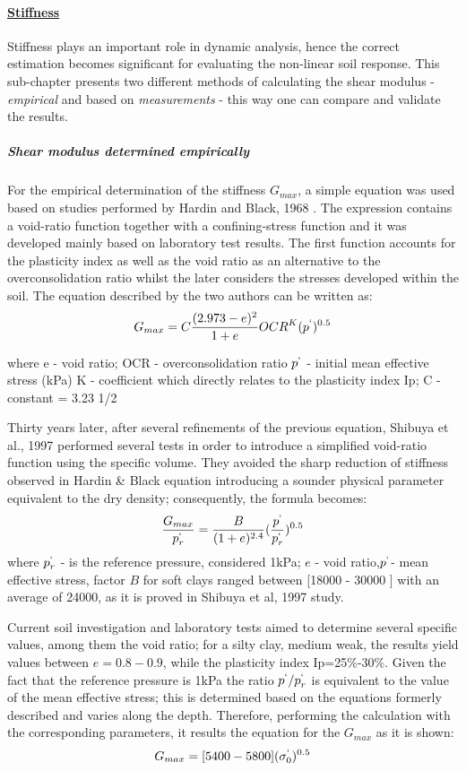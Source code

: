 \documentclass[12pt,a4paper]{report}
\begin{document}
\paragraph{\underline{Stiffness}}
Stiffness plays an important role in dynamic analysis, hence the correct estimation becomes significant for evaluating the non-linear soil response. This sub-chapter presents two different methods of calculating the shear modulus - \textit{empirical} and based on \textit{measurements} - this way one can compare and validate the results.

\subparagraph{Shear modulus determined empirically}
For the empirical determination of the stiffness $G_{max}$, a simple equation was used based on studies performed by Hardin and Black, 1968 \cite{hardin1972shear}. The expression contains a void-ratio function together with a confining-stress function and it was developed mainly based on laboratory test results. The first function accounts for the plasticity index as well as the void ratio as an alternative to the overconsolidation ratio whilst the later considers the stresses developed within the soil. The equation described by the two authors can be written as:
\begin{equation}
	G_{max}=C \frac{(2.973-e)^2}{1+e}OCR^K(p^`)^{0.5}
\end{equation}

where e - void ratio;
OCR - overconsolidation ratio
$p^`$ - initial mean effective stress (kPa)
K - coefficient which directly relates to the plasticity index Ip;
C - constant = 3.23 1/2 

Thirty years later, after several refinements of the previous equation, Shibuya et al., 1997 \cite{shibuya1997elastic} performed several tests in order to introduce a simplified void-ratio function using the specific volume. They avoided the sharp reduction of stiffness observed in Hardin \& Black equation introducing a sounder physical parameter equivalent to the dry density; consequently, the formula becomes:
\begin{equation}
\frac{G_{max}}{p^`_r}=\frac{B}{(1+e)^{2.4}}(\frac{p^`}{p^`_r})^{0.5}
\end{equation}
where $p^`_r$ - is the reference pressure, considered 1kPa; $e$ - void ratio,$p^`$- mean effective stress, factor $B$ for soft clays ranged between [18000 - 30000 ] with an average of 24000, as it is proved in Shibuya et al, 1997 study.

Current soil investigation and laboratory tests aimed to determine several specific values, among them the void ratio; for a silty clay, medium weak, the results yield values between $e=0.8-0.9$, while the plasticity index Ip=25\%-30\%. Given the fact that the reference pressure is 1kPa the ratio $p^`/p^`_r$ is equivalent to the value of the mean effective stress; this is determined based on the equations formerly described and varies along the depth. Therefore, performing the calculation with the corresponding parameters, it results the equation for the $G_{max}$ as it is shown:
\begin{equation}
	G_{max}=[5400-5800](\sigma^`_0)^{0.5}
\end{equation}
\end{document}
